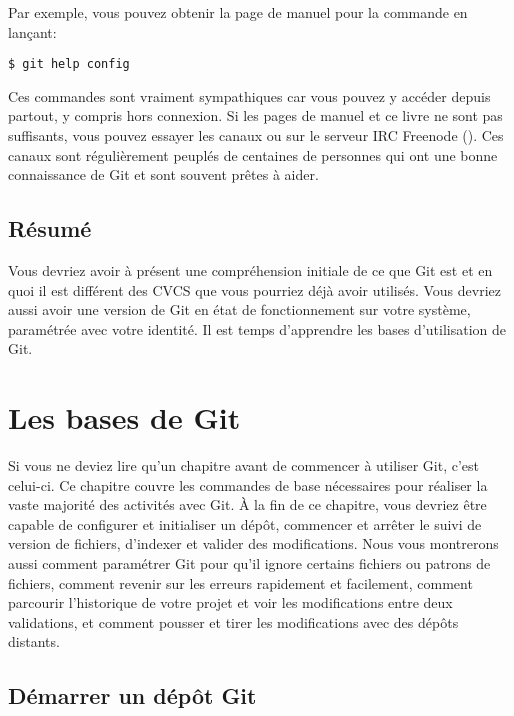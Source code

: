 Par exemple, vous pouvez obtenir la page de manuel pour la commande  en lançant:
\begin{Schunk}
\begin{Verbatim}
$ git help config
\end{Verbatim}
\end{Schunk}

Ces commandes sont vraiment sympathiques car vous pouvez y accéder depuis partout, y compris hors connexion.
Si les pages de manuel et ce livre ne sont pas suffisants, vous pouvez essayer les canaux  ou  sur le serveur IRC Freenode ().
Ces canaux sont régulièrement peuplés de centaines de personnes qui ont une bonne connaissance de Git et sont souvent prêtes à aider.

\subsection{Résumé}

Vous devriez avoir à présent une compréhension initiale de ce que Git est et en quoi il est différent des CVCS que vous pourriez déjà avoir utilisés.
Vous devriez aussi avoir une version de Git en état de fonctionnement sur votre système, paramétrée avec votre identité.
Il est temps d'apprendre les bases d'utilisation de Git.


\section{Les bases de Git}
\label{sec:git:basics}

Si vous ne deviez lire qu'un chapitre avant de commencer à utiliser Git, c'est celui-ci.
Ce chapitre couvre les commandes de base nécessaires pour réaliser la vaste majorité des activités avec Git.
À la fin de ce chapitre, vous devriez être capable de configurer et initialiser un dépôt, commencer et arrêter le suivi de version de fichiers, d'indexer et valider des modifications.
Nous vous montrerons aussi comment paramétrer Git pour qu'il ignore certains fichiers ou patrons de fichiers, comment revenir sur les erreurs rapidement et facilement, comment parcourir l'historique de votre projet et voir les modifications entre deux validations, et comment pousser et tirer les modifications avec des dépôts distants.

\subsection{Démarrer un dépôt Git}
\label{sec:git:getting_a_repo}

